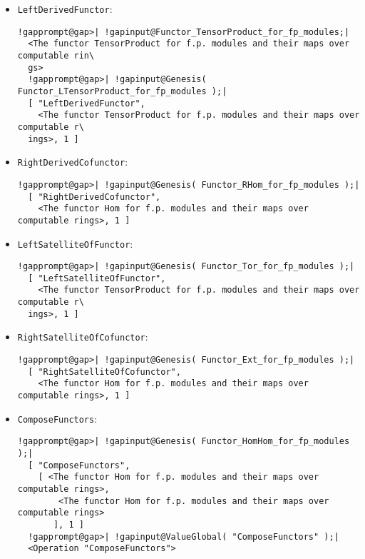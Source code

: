 \documentclass[a4paper,11pt]{report}
\begin{document}
{{{\begin{itemize}
\item  \texttt{LeftDerivedFunctor}: 
\begin{Verbatim}[commandchars=!@|,fontsize=\small,frame=single,label=Example]
  !gapprompt@gap>| !gapinput@Functor_TensorProduct_for_fp_modules;|
  <The functor TensorProduct for f.p. modules and their maps over computable rin\
  gs>
  !gapprompt@gap>| !gapinput@Genesis( Functor_LTensorProduct_for_fp_modules );|
  [ "LeftDerivedFunctor",
    <The functor TensorProduct for f.p. modules and their maps over computable r\
  ings>, 1 ]
\end{Verbatim}

\item  \texttt{RightDerivedCofunctor}: 
\begin{Verbatim}[commandchars=!@|,fontsize=\small,frame=single,label=Example]
  !gapprompt@gap>| !gapinput@Genesis( Functor_RHom_for_fp_modules );|
  [ "RightDerivedCofunctor",
    <The functor Hom for f.p. modules and their maps over computable rings>, 1 ]
\end{Verbatim}

\item  \texttt{LeftSatelliteOfFunctor}: 
\begin{Verbatim}[commandchars=!@|,fontsize=\small,frame=single,label=Example]
  !gapprompt@gap>| !gapinput@Genesis( Functor_Tor_for_fp_modules );|
  [ "LeftSatelliteOfFunctor",
    <The functor TensorProduct for f.p. modules and their maps over computable r\
  ings>, 1 ]
\end{Verbatim}

\item  \texttt{RightSatelliteOfCofunctor}: 
\begin{Verbatim}[commandchars=!@|,fontsize=\small,frame=single,label=Example]
  !gapprompt@gap>| !gapinput@Genesis( Functor_Ext_for_fp_modules );|
  [ "RightSatelliteOfCofunctor",
    <The functor Hom for f.p. modules and their maps over computable rings>, 1 ]
\end{Verbatim}

\item  \texttt{ComposeFunctors}: 
\begin{Verbatim}[commandchars=!@|,fontsize=\small,frame=single,label=Example]
  !gapprompt@gap>| !gapinput@Genesis( Functor_HomHom_for_fp_modules );|
  [ "ComposeFunctors",
    [ <The functor Hom for f.p. modules and their maps over computable rings>,
        <The functor Hom for f.p. modules and their maps over computable rings>
       ], 1 ]
  !gapprompt@gap>| !gapinput@ValueGlobal( "ComposeFunctors" );|
  <Operation "ComposeFunctors">
\end{Verbatim}


\end{itemize}}}}
\end{document}
